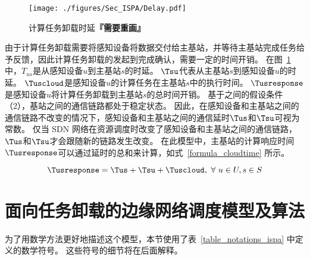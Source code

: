 \begin{figure}[!h]
  \centering
  \vspace{-1em}
  \texttt{[image: ./figures/Sec\_ISPA/Delay.pdf]}
  \vspace{-1em}
  \caption{计算任务卸载时延\textbf{『需要重画』}}
  \vspace{-1em}
  \label{fig_timestaps}
\end{figure}

由于计算任务卸载需要将感知设备将数据交付给主基站，并等待主基站完成任务给予反馈，因此计算任务卸载的发起到完成确认，需要一定的时间开销。
在图~\ref{fig_timestaps} 中，${T}_{us}$是从感知设备$u$到主基站$s$的时延。
$\Tsu$代表从主基站$s$到感知设备$u$的时延。
$\Tuscloud$是感知设备$u$的计算任务在主基站$s$中的执行时间。
$\Tusresponse$是感知设备$u$将计算任务卸载到主基站$s$的总时间开销。
基于之间的假设条件（2），基站之间的通信链路都处于稳定状态。
因此，在感知设备和主基站之间的通信链路不改变的情况下，感知设备和主基站之间的通信延时$\Tus$和$\Tsu$可视为常数。
仅当 SDN 网络在资源调度时改变了感知设备和主基站之间的通信链路，$\Tus$和$\Tsu$才会跟随新的链路发生改变。
在此模型中，主基站的计算响应时间$\Tusresponse$可以通过延时的总和来计算，如式~\eqref{formula_cloudtime} 所示。


\begin{equation}
\label{formula_cloudtime}
\Tusresponse = \Tus + \Tsu + \Tuscloud,\ \forall \ u \in U, s \in S
\end{equation}

\section{面向任务卸载的边缘网络调度模型及算法}

为了用数学方法更好地描述这个模型，本节使用了表~\ref{table_notations_ispa} 中定义的数学符号。 这些符号的细节将在后面解释。

